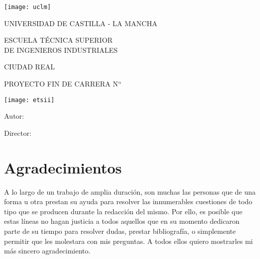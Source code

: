 

\begin{titlepage}

\begin{center}
\texttt{[image: uclm]}
\bigskip
\medskip

\fontsize{17pt}{19pt}
{\selectfont  UNIVERSIDAD DE CASTILLA - LA MANCHA} \\ 
\bigskip
\smallskip

{\selectfont ESCUELA TÉCNICA SUPERIOR \\ \medskip
DE INGENIEROS INDUSTRIALES}


\bigskip
\medskip
{}\fontsize{15pt}{17pt}
{\selectfont CIUDAD REAL}

\vspace*{2cm} 

\fontsize{17pt}{19pt}
{\selectfont
PROYECTO FIN DE CARRERA N$^{\rm o}$ \makenumero \\
\bigskip
\bigskip
\bigskip
\maketitulo}

\vfill
\noindent\begin{minipage}{0.42\textwidth}
\quad\texttt{[image: etsii]}
\end{minipage}
\begin{minipage}{0.55\textwidth}
  \begin{flushleft}
\fontsize{15pt}{15pt}
{\selectfont
 Autor:\\[-.2mm]
\makeautor

\bigskip
Director:\\[-.2mm]
\makedirector

\bigskip
\makefecha
}
  \end{flushleft}
\end{minipage}
\end{center}
\end{titlepage}
                                
\normalsize \rm
\renewcommand{\thepage}{\Roman{page}}



\thispagestyle{empty}
\chapter*{Agradecimientos}
\thispagestyle{empty}

A lo largo de un trabajo de amplia duración, son muchas las personas
que de una forma u otra prestan su ayuda para resolver las
innumerables cuestiones de todo tipo que se producen durante
la redacción del
mismo. Por ello, es posible que estas líneas no hagan justicia
a todos aquellos que en su momento dedicaron parte de su tiempo
para resolver dudas, prestar bibliografía, o simplemente permitir
que les molestara con mis preguntas. A todos ellos
quiero mostrarles mi más sincero agradecimiento.

